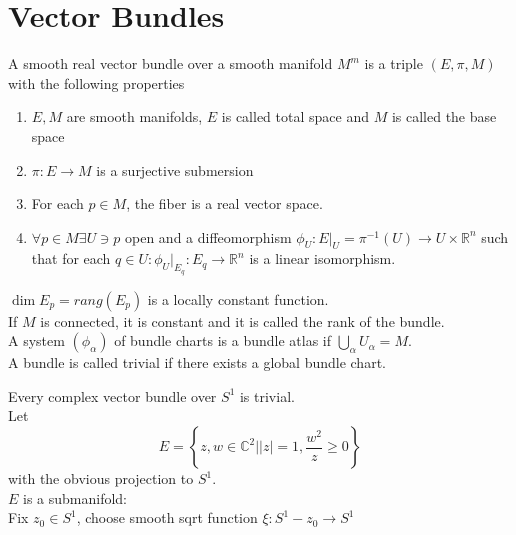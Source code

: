 \documentclass[../main.tex]{subfiles}
\begin{document}
\section{Vector Bundles}
\begin{defn}
	A smooth real vector bundle over a smooth manifold $M^{m}$ is a triple $( E,\pi,M) $ with the following properties
	\begin{enumerate}
	\item $E,M$ are smooth manifolds, $E$ is called total space and $M$ is called the base space
	\item $\pi:E\to M$ is a surjective submersion
	\item For each $p\in M$, the fiber is a real vector space.
	\item $\forall p \in M \exists U \ni p$ open and a diffeomorphism $\phi_U: E|_U = \pi^{-1}( U) \to U \times \mathbb{R}^n$ such that for each $q\in U: \phi_U|_{E_q}: E_q \to \mathbb{R}^n $ is a linear isomorphism.
	\end{enumerate}
\end{defn}
\begin{rmq}
$\dim E_p = rang( E_p) $ is a locally constant function.\\
If $M$ is connected, it is constant and it is called the rank of the bundle.\\
A system $ ( \phi_\alpha) $ of bundle charts is a bundle atlas if $\bigcup_\alpha U_\alpha = M$.\\
A bundle is called trivial if there exists a global bundle chart.
\end{rmq}
\begin{exemple}
Every complex vector bundle over $S^{1}$ is trivial.\\
Let
\[ 
E= \left\{ z,w \in \mathbb{C}^{2}| |z|=1, \frac{w^{2}}{z} \geq 0 \right\} 
\]
with the obvious projection to $S^{1}$.\\
$E$ is a submanifold:\\
Fix $z_0\in S^{1}$, choose smooth sqrt function $\xi: S^{1}- z_0 \to S^{1}$ 
\end{exemple}
\end{document}
